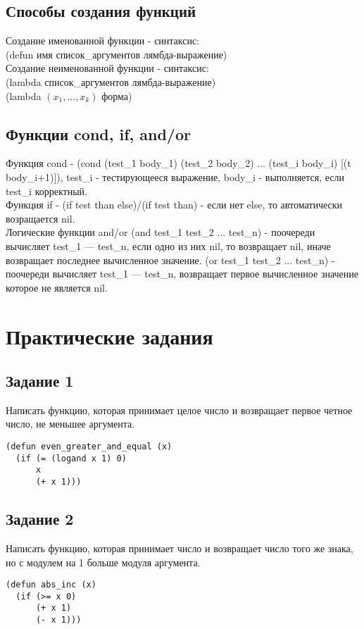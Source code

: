 \section{Способы создания функций}
Создание именованной функции - синтаксис:\\
(defun имя список\_аргументов лямбда-выражение)\\

Создание неименованной функции - синтаксис:\\
(lambda список\_аргументов лямбда-выражение)\\
(lambda $(x_{1}, ..., x_{k})$ форма)\\

\section{Функции cond, if, and/or}
Функция cond - (cond (test\_1 body\_1) (test\_2 body\_2) ... (test\_i body\_i) [(t body\_i+1)]), test\_i - тестирующееся выражение, body\_i - выполняется, если test\_i корректный.\\
Функция if - (if test than else)/(if test than) - если нет else, то автоматически
возращается nil.\\
Логические функции and/or (and test\_1 test\_2 ... test\_n) - поочереди вычисляет test\_1 --- test\_n, если одно из них nil, то возвращает nil, иначе возвращает последнее вычисленное значение. (or test\_1 test\_2 ... test\_n) - поочереди вычисляет test\_1 --- test\_n, возвращает первое вычисленное значение которое не является nil.
\chapter{Практические задания}
\section{Задание 1}
Написать функцию, которая принимает целое число и возвращает первое
четное число, не меньшее аргумента.
\begin{lstlisting}
(defun even_greater_and_equal (x)
  (if (= (logand x 1) 0)
      x
      (+ x 1)))
\end{lstlisting}
\section{Задание 2}
Написать функцию, которая принимает число и возвращает число
того же знака, но с модулем на 1 больше модуля аргумента.
\begin{lstlisting}
(defun abs_inc (x)
  (if (>= x 0)
      (+ x 1)
      (- x 1)))
\end{lstlisting}
